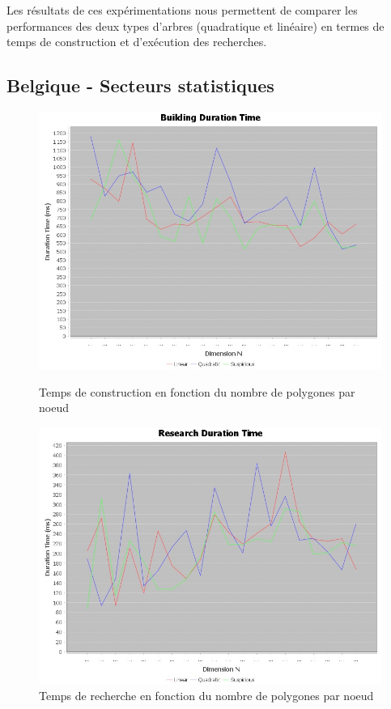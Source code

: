\documentclass {article}
\begin{document}
Les résultats de ces expérimentations nous permettent de comparer les performances des deux types d'arbres
(quadratique et linéaire) en termes de temps de construction et d'exécution des recherches.

\subsection {Belgique - Secteurs statistiques}\label{belgique}

\begin{figure}[h]
    \begin{minipage}[t]{0.46\textwidth}
	\centering
	\includegraphics[width=\textwidth]{building_graph_belgium.png}
	\caption{Temps de construction en fonction du nombre de polygones par noeud}
	\label{fig:belgique_stat_find_lin}
    \end{minipage}
    \begin{minipage}[t]{0.46\textwidth}
	\centering
	\includegraphics[width=\textwidth]{research_graph_belgium.png}
	\caption{Temps de recherche en fonction du nombre de polygones par noeud}
	\label{fig:belgique_stat_find_quad}
    \end{minipage}
\end{figure}
\end{document}
